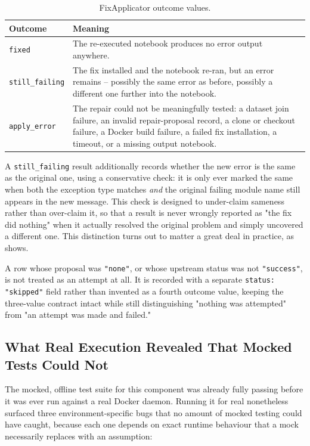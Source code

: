 \begin{table}[h]
  \centering
  \begin{tabular}{|l|p{9.3cm}|}
    \hline
    \textbf{Outcome} & \textbf{Meaning} \\
    \hline
    \texttt{fixed} & The re-executed notebook produces no error output anywhere. \\
    \hline
    \texttt{still\_failing} & The fix installed and the notebook re-ran, but an error remains -- possibly the same error as before, possibly a different one further into the notebook. \\
    \hline
    \texttt{apply\_error} & The repair could not be meaningfully tested: a dataset join failure, an invalid repair-proposal record, a clone or checkout failure, a Docker build failure, a failed fix installation, a timeout, or a missing output notebook. \\
    \hline
  \end{tabular}
  \caption{FixApplicator outcome values.}
  \label{tab:m-outcomes}
\end{table}

A \texttt{still\_failing} result additionally records whether the new error
is the same as the original one, using a conservative check: it is only
ever marked the same when both the exception type matches \emph{and} the
original failing module name still appears in the new message. This check
is designed to under-claim sameness rather than over-claim it, so that a
result is never wrongly reported as "the fix did nothing" when it actually
resolved the original problem and simply uncovered a different one. This
distinction turns out to matter a great deal in practice, as
 shows.

A row whose proposal was \texttt{"none"}, or whose upstream status was not
\texttt{"success"}, is not treated as an attempt at all. It is recorded with
a separate \texttt{status: "skipped"} field rather than invented as a
fourth outcome value, keeping the three-value contract intact while still
distinguishing "nothing was attempted" from "an attempt was made and
failed."

\subsection{What Real Execution Revealed That Mocked Tests Could Not}
\label{sec:m-fixapply-bugs}

The mocked, offline test suite for this component was already fully passing
before it was ever run against a real Docker daemon. Running it for real
nonetheless surfaced three environment-specific bugs that no amount of
mocked testing could have caught, because each one depends on exact runtime
behaviour that a mock necessarily replaces with an assumption:

